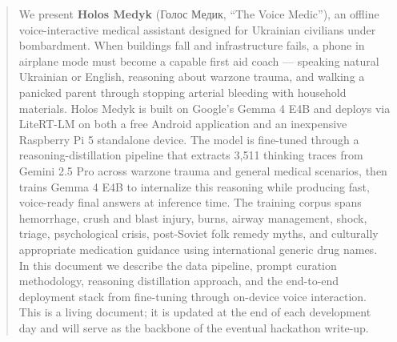 \documentclass{article}
\theoremstyle{plain}
\theoremstyle{definition}
\theoremstyle{remark}
\begin{document}

\printAffiliationsAndNotice{}

\begin{abstract}
We present \textbf{Holos Medyk} (Голос Медик, ``The Voice Medic''), an offline voice-interactive medical assistant designed for Ukrainian civilians under bombardment. When buildings fall and infrastructure fails, a phone in airplane mode must become a capable first aid coach — speaking natural Ukrainian or English, reasoning about warzone trauma, and walking a panicked parent through stopping arterial bleeding with household materials. Holos Medyk is built on Google's Gemma 4 E4B and deploys via LiteRT-LM on both a free Android application and an inexpensive Raspberry Pi 5 standalone device. The model is fine-tuned through a reasoning-distillation pipeline that extracts 3{,}511 thinking traces from Gemini 2.5 Pro across warzone trauma and general medical scenarios, then trains Gemma 4 E4B to internalize this reasoning while producing fast, voice-ready final answers at inference time. The training corpus spans hemorrhage, crush and blast injury, burns, airway management, shock, triage, psychological crisis, post-Soviet folk remedy myths, and culturally appropriate medication guidance using international generic drug names. In this document we describe the data pipeline, prompt curation methodology, reasoning distillation approach, and the end-to-end deployment stack from fine-tuning through on-device voice interaction. This is a living document; it is updated at the end of each development day and will serve as the backbone of the eventual hackathon write-up.
\end{abstract}
\end{document}
